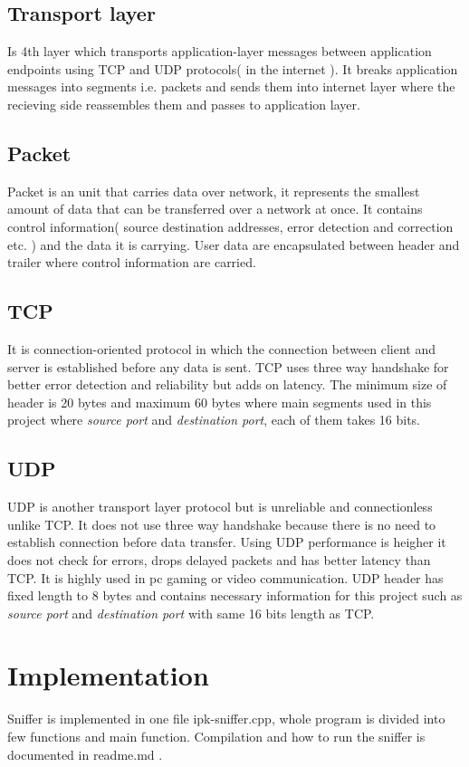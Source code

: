 \documentclass{article}
\begin{document}
\subsection*{Transport layer}
Is 4th layer which transports application-layer messages between application endpoints using TCP and UDP protocols( in the internet ). It breaks application messages into segments i.e. packets and sends them into internet layer where the recieving side reassembles them and passes to application layer.
\subsection*{Packet}
Packet is an unit that carries data over network, it represents the smallest amount of data that can be transferred over a network at once. It contains control information( source destination addresses, error detection and correction etc. ) and the data it is carrying. User data are encapsulated between header and trailer where control information are carried.
\subsection*{TCP}
It is connection-oriented protocol in which the connection between client and server is established before any data is sent. TCP uses three way handshake for better error detection and reliability but adds on latency. The minimum size of header is 20 bytes and maximum 60 bytes where main segments used in this project  where \textit{source port} and \textit{destination port}, each of them takes 16 bits.
\subsection*{UDP}
UDP is another transport layer protocol but is unreliable and connectionless unlike TCP. It does not use three way handshake because there is no need to establish connection before data transfer. Using UDP performance is heigher it does not check for errors, drops delayed packets and has better latency than TCP. It is highly used in pc gaming or video communication. UDP header has fixed length to 8 bytes and contains necessary information for this project such as \textit{source port} and \textit{destination port} with same 16 bits length as TCP.
\newpage


\section{Implementation}
	Sniffer is implemented in one file ipk-sniffer.cpp, whole program is divided into few 				functions and main function. Compilation and how to run the sniffer is documented in readme.md .
\end{document}
